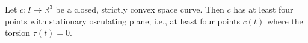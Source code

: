 Let $c: I \to \mathbb{R}^3$ be a closed, strictly convex space curve. Then $c$ has at least four points with stationary osculating plane; i.e., at least four points $c(t)$ where the torsion $\tau(t) = 0$.
